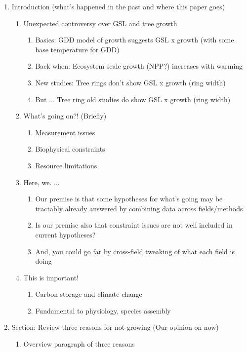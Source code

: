 \documentclass[11pt,letter]{article}
\begin{document}
\begin{enumerate}
\item Introduction (what's happened in the past and where this paper goes)
\begin{enumerate}
\item Unexpected controversy over GSL and tree growth 
\begin{enumerate}
\item Basics: GDD model of growth suggests GSL x growth (with some base temperature for GDD)
\item Back when: Ecosystem scale growth (NPP?) increases with warming
\item New studies: Tree rings don't show GSL x growth (ring width)
\item But ... Tree ring old studies do show GSL x growth (ring width) 
\end{enumerate}
\item What's going on?! (Briefly)
\begin{enumerate}
\item Measurement issues 
\item Biophysical constraints
\item Resource limitations
\end{enumerate}
\item Here, we. ...
\begin{enumerate}
\item Our premise is that some hypotheses for what's going may be tractably already answered by combining data across fields/methods
\item Is our premise also that constraint issues are not well included in current hypotheses?
\item And, you could go far by cross-field tweaking of what each field is doing
\end{enumerate}
\item This is important! 
\begin{enumerate}
\item Carbon storage and climate change
\item Fundamental to physiology, species assembly
\end{enumerate}
\end{enumerate}
\item Section: Review three reasons for not growing (Our opinion on now)
\begin{enumerate} 
\item Overview paragraph of three reasons

\end{enumerate}
\end{enumerate}
\end{document}
